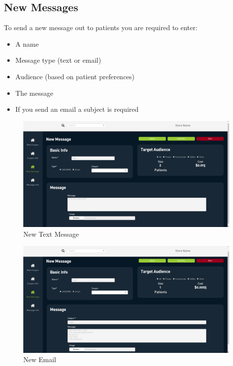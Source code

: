 \documentclass[]{book}
\theoremstyle{definition}
\theoremstyle{definition}
\theoremstyle{definition}
\theoremstyle{remark}
\begin{document}
\subsection{New Messages}\label{new-messages}

To send a new message out to patients you are required to enter:

\begin{itemize}
\item
  A name
\item
  Message type (text or email)
\item
  Audience (based on patient preferences)
\item
  The message
\item
  If you send an email a subject is required
\end{itemize}

\begin{figure}
\centering
\includegraphics{images/C5.png}
\caption{New Text Message}
\end{figure}

\begin{figure}
\centering
\includegraphics{images/C6.png}
\caption{New Email}
\end{figure}
\end{document}

